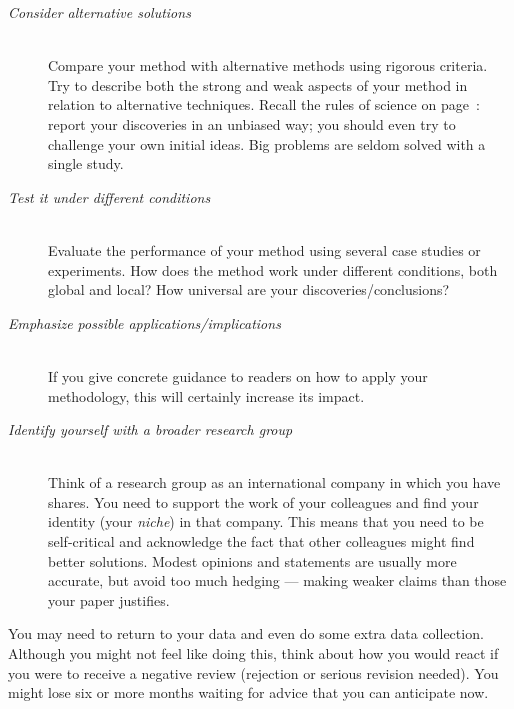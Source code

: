 \documentclass[graybox,envcountchap,sectrefs,UStrade]{svmono}
\begin{document}
\begin{description}
 \item[\emph{Consider alternative solutions}] \hfill \\
      Compare your method with alternative methods using rigorous criteria. Try to describe both the strong and weak aspects of your method in relation to alternative techniques. Recall the rules of science on page~\pageref{F:rules}: report your discoveries in an unbiased way; you should even try to challenge your own initial ideas. Big problems are seldom solved with a single study.\medskip
 \item[\emph{Test it under different conditions}] \hfill \\
      Evaluate the performance of your method using several case studies or experiments. How does the method work under different conditions, both global and local? How universal are your discoveries/conclusions?\medskip
 \item[\emph{Emphasize possible applications/implications}] \hfill \\
      If you give concrete guidance to readers on how to apply your methodology, this will certainly increase its impact.\medskip
 \item[\emph{Identify yourself with a broader research group}] \hfill \\
      Think of a research group as an international company in which you have shares. You need to support the work of your colleagues and find your identity (your \emph{niche}) in that company. This means that you need to be self-critical and acknowledge the fact that other colleagues might find better solutions. Modest opinions and statements are usually more accurate, but avoid too much hedging --- making weaker claims than those your paper justifies.
\end{description}

You may need to return to your data and even do some extra data collection. Although you might not feel like doing this, think about how you would react if you were to receive a negative review (rejection or serious revision needed). You might lose six or more months waiting for advice that you can anticipate now. \par
\end{document}
